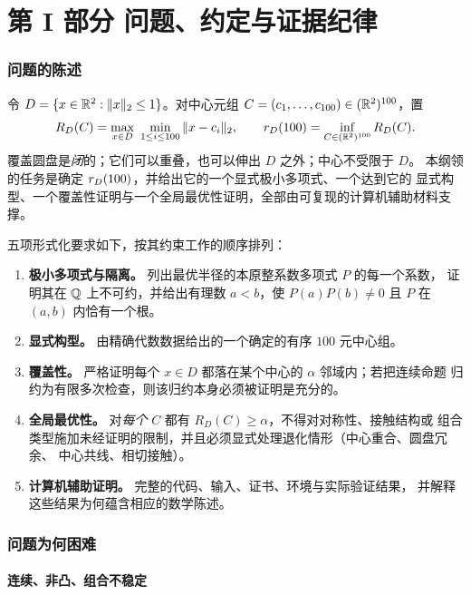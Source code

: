 \part*{第 I 部分 问题、约定与证据纪律}
\setcounter{section}{0}

\section{问题的陈述}

\begin{definition}
令 $D=\{x\in\mathbb{R}^2:\|x\|_2\le1\}$。对中心元组 $C=(c_1,\dots,c_{100})\in(\mathbb{R}^2)^{100}$，置
\[
R_D(C)=\max_{x\in D}\ \min_{1\le i\le 100}\|x-c_i\|_2,
\qquad
r_{D}(100)=\inf_{C\in(\mathbb{R}^2)^{100}}R_D(C).
\]
覆盖圆盘是\emph{闭}的；它们可以重叠，也可以伸出 $D$ 之外；中心不受限于 $D$。
本纲领的任务是确定 $r_{D}(100)$，并给出它的一个显式极小多项式、一个达到它的
显式构型、一个覆盖性证明与一个全局最优性证明，全部由可复现的计算机辅助材料支撑。
\end{definition}

五项形式化要求如下，按其约束工作的顺序排列：
\begin{enumerate}[leftmargin=1.6em,itemsep=2pt]
\item \textbf{极小多项式与隔离。} 列出最优半径的本原整系数多项式 $P$ 的每一个系数，
证明其在 $\mathbb{Q}$ 上不可约，并给出有理数 $a<b$，使 $P(a)P(b)\ne0$
且 $P$ 在 $(a,b)$ 内恰有一个根。
\item \textbf{显式构型。} 由精确代数数据给出的一个确定的有序 $100$ 元中心组。
\item \textbf{覆盖性。} 严格证明每个 $x\in D$ 都落在某个中心的 $\alpha$ 邻域内；若把连续命题
归约为有限多次检查，则该归约本身必须被证明是充分的。
\item \textbf{全局最优性。} 对\emph{每个} $C$ 都有 $R_D(C)\ge\alpha$，不得对对称性、接触结构或
组合类型施加未经证明的限制，并且必须显式处理退化情形（中心重合、圆盘冗余、
中心共线、相切接触）。
\item \textbf{计算机辅助证明。} 完整的代码、输入、证书、环境与实际验证结果，
并解释这些结果为何蕴含相应的数学陈述。
\end{enumerate}

\section{问题为何困难}

\subsection{连续、非凸、组合不稳定}

